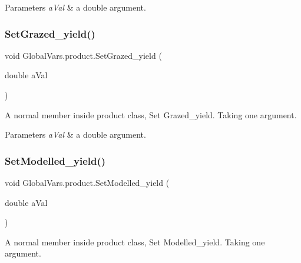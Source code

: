 \begin{DoxyParams}{Parameters}
{\em a\+Val} & a double argument. \\
\hline
\end{DoxyParams}
\mbox{\label{class_global_vars_1_1product_a1abfaf513605e36d1b477e91534f7657}} 
\subsubsection{\texorpdfstring{SetGrazed\_yield()}{SetGrazed\_yield()}}
{\footnotesize\ttfamily void Global\+Vars.\+product.\+Set\+Grazed\+\_\+yield (\begin{DoxyParamCaption}\item[{double}]{a\+Val }\end{DoxyParamCaption})\hspace{0.3cm}{\ttfamily [inline]}}



A normal member inside product class, Set Grazed\+\_\+yield. Taking one argument. 


\begin{DoxyParams}{Parameters}
{\em a\+Val} & a double argument. \\
\hline
\end{DoxyParams}
\mbox{\label{class_global_vars_1_1product_a717c1a27b094cb7b905c6093c4006a2c}} 
\subsubsection{\texorpdfstring{SetModelled\_yield()}{SetModelled\_yield()}}
{\footnotesize\ttfamily void Global\+Vars.\+product.\+Set\+Modelled\+\_\+yield (\begin{DoxyParamCaption}\item[{double}]{a\+Val }\end{DoxyParamCaption})\hspace{0.3cm}{\ttfamily [inline]}}



A normal member inside product class, Set Modelled\+\_\+yield. Taking one argument. 



